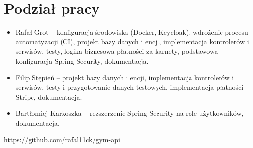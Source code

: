 \documentclass[../../spr.tex]{subfiles}
\begin{document}
\section{Podział pracy}

\begin{itemize}
  \item  Rafał Grot -- konfiguracja środowiska (Docker, Keycloak),
        wdrożenie procesu automatyzacji (CI), projekt bazy danych i encji,
        implementacja kontrolerów i serwisów, testy, logika biznesowa płatności za karnety,
        podstawowa konfiguracja Spring Security, dokumentacja.
  \item Filip Stępień -- projekt bazy danych i encji, implementacja kontrolerów i serwisów, testy i przygotowanie danych testowych, implementacja płatności Stripe, dokumentacja.
  \item Bartłomiej Karkoszka -- rozszerzenie Spring Security na role użytkowników, dokumentacja.
\end{itemize}

\url{https://github.com/rafal11ck/gym-api}
\end{document}
